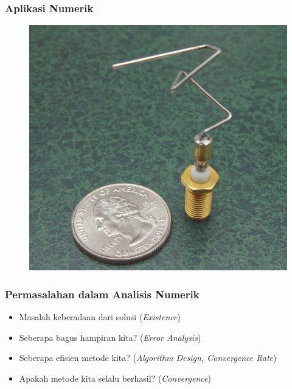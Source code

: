 \documentclass{beamer}
\begin{document}
\begin{frame}
\frametitle{Aplikasi Numerik}
\begin{figure}[htp]
\centering
\includegraphics[scale=0.30]{9sh549.png}
\end{figure}
\end{frame}
\begin{frame}
\frametitle{Permasalahan dalam Analisis Numerik}
\begin{itemize}
\item Masalah keberadaan dari solusi (\textit{Existence})
\item Seberapa bagus hampiran kita? (\textit{Error Analysis})
\item Seberapa efisien metode kita? (\textit{Algorithm Design, Convergence Rate})
\item Apakah metode kita selalu berhasil? (\textit{Convergence})
\end{itemize}
\end{frame}
\end{document}
